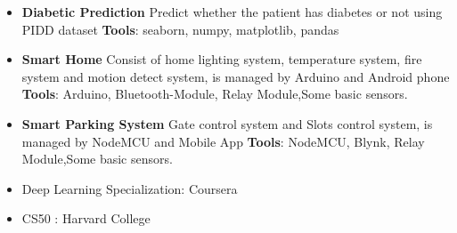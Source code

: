 \begin{itemize}
\item  \textbf {Diabetic Prediction} \href{https://github.com/Yasien99/Pima-Indians-Diabetes-Prediction}{ \ExternalLink} \newline 
Predict whether the patient has diabetes or not using PIDD dataset \newline \textbf {Tools}:
seaborn, numpy, matplotlib, pandas 
\end{itemize}
\smallskip

\begin{itemize}
\item \textbf {Smart Home} \href{https://github.com/Yasien99/Smart_Home_Demo}{ \ExternalLink}\newline Consist of home lighting system, temperature system, fire system and motion detect system, is managed by Arduino and Android phone
\newline \textbf {Tools}: Arduino, Bluetooth-Module, Relay Module,Some basic sensors.
\smallskip
\item  \textbf {Smart Parking System} \newline Gate control system and Slots control system, is managed by NodeMCU and Mobile App 
\newline \textbf {Tools}: NodeMCU, Blynk, Relay Module,Some basic sensors.
\smallskip
\end{itemize}
\smallskip

\smallskip
\begin{itemize}
\item Deep Learning Specialization: Coursera
\smallskip
\item CS50 : Harvard College
\end{itemize}
